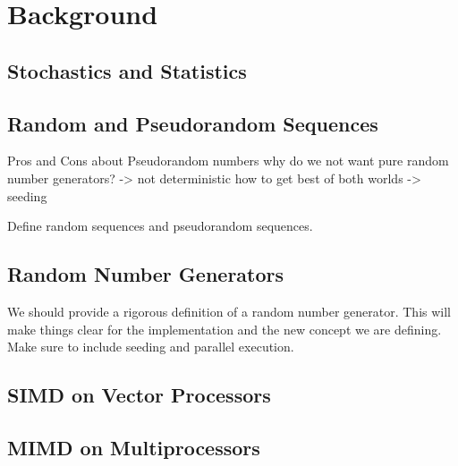 \documentclass[crop=false]{standalone}
\begin{document}
  \section{Background} %
  \label{sec:background}
    \subsection{Stochastics and Statistics} %
    \label{sub:stochastics_and_statistics}


    \subsection{Random and Pseudorandom Sequences} %
    \label{sub:random_and_pseudorandom_sequences}
      Pros and Cons about Pseudorandom numbers
      why do we not want pure random number generators? -> not deterministic
      how to get best of both worlds -> seeding

      Define random sequences and pseudorandom sequences.

    \subsection{Random Number Generators} %
    \label{sub:random_number_generators}
      We should provide a rigorous definition of a random number generator.
      This will make things clear for the implementation and the new concept we are defining.
      Make sure to include seeding and parallel execution.

    \subsection{SIMD on Vector Processors} %
    \label{sub:vector_processors}


    \subsection{MIMD on Multiprocessors} %
    \label{sub:parallelization}

\end{document}
